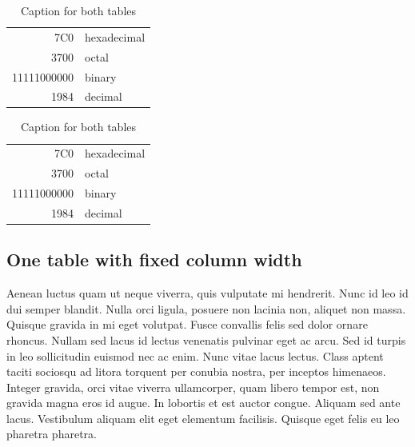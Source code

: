 \begin{table}[!htb]
    \begin{subtable}{.5\linewidth}
      \centering
        \begin{tabular}{|r|l|}
            \hline
            7C0 & hexadecimal \\
            3700 & octal \\ \cline{2-2}
            11111000000 & binary \\
            \hline \hline
            1984 & decimal \\
            \hline
        \end{tabular}
        \caption{Caption for the first sub-table}
        \label{tab:testtab3}
    \end{subtable}%
    \begin{subtable}{.5\linewidth}
      \centering
        \begin{tabular}{|r|l|}
            \hline
            7C0 & hexadecimal \\
            3700 & octal \\ \cline{2-2}
            11111000000 & binary \\
            \hline \hline
            1984 & decimal \\
            \hline
        \end{tabular}
        \caption{Caption for the second sub-table}
        \label{tab:testtab4}
    \end{subtable}
    \caption{Caption for both tables}
    \label{tab:testtab2}
\end{table}

\subsection{One table with fixed column width}
Aenean luctus quam ut neque viverra, quis vulputate mi hendrerit. Nunc id leo
id dui semper blandit. Nulla orci ligula, posuere non lacinia non, aliquet non
massa. Quisque gravida in mi eget volutpat. Fusce convallis felis sed dolor
ornare rhoncus. Nullam sed lacus id lectus venenatis pulvinar eget ac arcu. Sed
id turpis in leo sollicitudin euismod nec ac enim. Nunc vitae lacus lectus.
Class aptent taciti sociosqu ad litora torquent per conubia nostra, per
inceptos himenaeos. Integer gravida, orci vitae viverra ullamcorper, quam
libero tempor est, non gravida magna eros id augue. In lobortis et est auctor
congue. Aliquam sed ante lacus. Vestibulum aliquam elit eget elementum
facilisis. Quisque eget felis eu leo pharetra pharetra.

